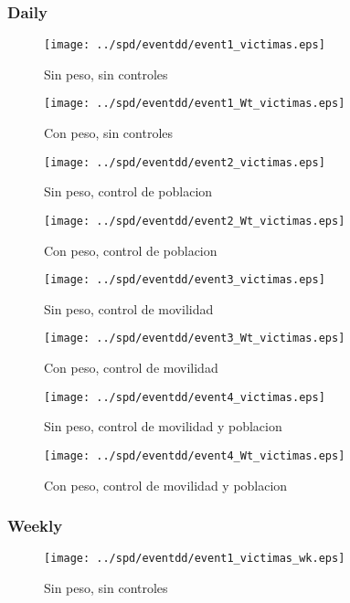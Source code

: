 \documentclass[11pt,letterpaper]{article}
\begin{document}
			\subsubsection{Daily}
\begin{figure}[hbtp]
\caption{Sin peso, sin controles}
\centering
\texttt{[image: ../spd/eventdd/event1\_victimas.eps]}
\end{figure}

\begin{figure}[hbtp]
\caption{Con peso, sin controles}
\centering
\texttt{[image: ../spd/eventdd/event1\_Wt\_victimas.eps]}
\end{figure}
\begin{figure}[hbtp]
\caption{Sin peso, control de poblacion}
\centering
\texttt{[image: ../spd/eventdd/event2\_victimas.eps]}
\end{figure}

\begin{figure}[hbtp]
\caption{Con peso, control de poblacion}
\centering
\texttt{[image: ../spd/eventdd/event2\_Wt\_victimas.eps]}
\end{figure}
\begin{figure}[hbtp]
\caption{Sin peso, control de movilidad}
\centering
\texttt{[image: ../spd/eventdd/event3\_victimas.eps]}
\end{figure}

\begin{figure}[hbtp]
\caption{Con peso, control de movilidad}
\centering
\texttt{[image: ../spd/eventdd/event3\_Wt\_victimas.eps]}
\end{figure}
\begin{figure}[hbtp]
\caption{Sin peso, control de movilidad y poblacion}
\centering
\texttt{[image: ../spd/eventdd/event4\_victimas.eps]}
\end{figure}

\begin{figure}[hbtp]
\caption{Con peso, control de movilidad y poblacion}
\centering
\texttt{[image: ../spd/eventdd/event4\_Wt\_victimas.eps]}
\end{figure}

		\subsubsection{Weekly}
\begin{figure}[hbtp]
\caption{Sin peso, sin controles}
\centering
\texttt{[image: ../spd/eventdd/event1\_victimas\_wk.eps]}
\end{figure}
\end{document}
